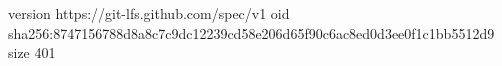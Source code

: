 version https://git-lfs.github.com/spec/v1
oid sha256:8747156788d8a8c7c9dc12239cd58e206d65f90c6ac8ed0d3ee0f1c1bb5512d9
size 401
